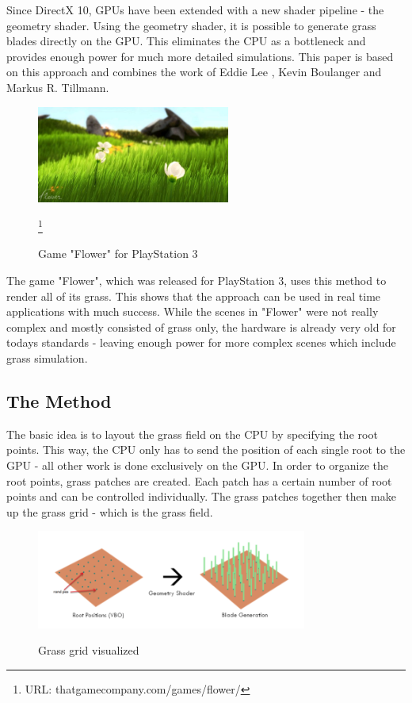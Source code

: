 \documentclass[conference]{acmsiggraph}
\begin{document}
Since DirectX 10, GPUs have been extended with a new shader pipeline - the geometry shader. Using the geometry shader, it is possible to generate grass blades directly on the GPU. This eliminates the CPU as a bottleneck and provides enough power for much more detailed simulations. This paper is based on this approach and combines the work of Eddie Lee \cite{EddieLee}, Kevin Boulanger \cite{KevinBoulanger} and Markus R. Tillmann.  \cite{Tillmann}

 \begin{figure}[ht]
   \centering
   \includegraphics[width=2.5in]{images/flower_game}
   \caption{Game "Flower" for PlayStation 3} \cite{Flower} \footnote{URL: thatgamecompany.com/games/flower/}
 \end{figure}    
 
The game "Flower", which was released for PlayStation 3, uses this method to render all of its grass. This shows that the approach can be used in real time applications with much success. While the scenes in "Flower" were not really complex and mostly consisted of grass only, the hardware is already very old for todays standards - leaving enough power for more complex scenes which include grass simulation.

\subsection{The Method}
The basic idea is to layout the grass field on the CPU by specifying the root points. This way, the CPU only has to send the position of each single root to the GPU - all other work is done exclusively on the GPU. In order to organize the root points, grass patches are created. Each patch has a certain number of root points and can be controlled individually. The grass patches together then 
make up the grass grid - which is the grass field.

 \begin{figure}[ht]
   \centering
   \includegraphics[width=3.5in]{images/grass_grid}
   \caption{Grass grid visualized} \cite{EddieLee}
 \end{figure}
\end{document}

